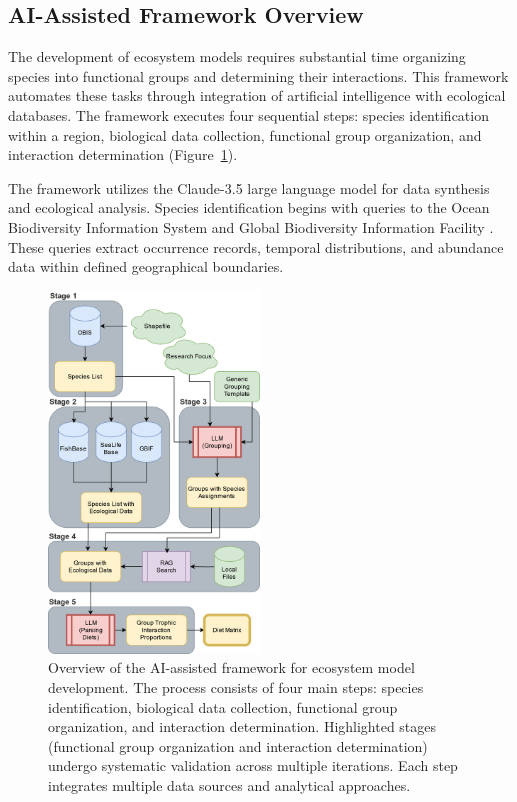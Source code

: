 \subsection{AI-Assisted Framework Overview}

The development of ecosystem models requires substantial time organizing species into functional groups and determining their interactions. This framework automates these tasks through integration of artificial intelligence with ecological databases. The framework executes four sequential steps: species identification within a region, biological data collection, functional group organization, and interaction determination (Figure~\ref{fig:framework_overview}).

The framework utilizes the Claude-3.5 large language model \citep{Anthropic2024} for data synthesis and ecological analysis. Species identification begins with queries to the Ocean Biodiversity Information System \citep{Grassle1999} and Global Biodiversity Information Facility \citep{GBIF2024}. These queries extract occurrence records, temporal distributions, and abundance data within defined geographical boundaries.

\begin{figure}[htbp]
    \centering
    \includegraphics[width=0.5\textwidth]{figures/EwE_AI.drawio.png}
    \caption{Overview of the AI-assisted framework for ecosystem model development. The process consists of four main steps: species identification, biological data collection, functional group organization, and interaction determination. Highlighted stages (functional group organization and interaction determination) undergo systematic validation across multiple iterations. Each step integrates multiple data sources and analytical approaches.}
    \label{fig:framework_overview}
\end{figure}

